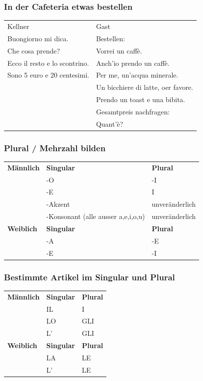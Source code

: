 \documentclass[10pt]{scrartcl}
\begin{document}
\subsubsection*{In der Cafeteria etwas bestellen}
\begin{tabular}{ll}
Kellner & Gast\\
Buongiorno mi dica. & Bestellen:\\
Che cosa prende? & Vorrei un caffè.\\
Ecco il resto e lo scontrino. & Anch'io prendo un caffè.\\
Sono 5 euro e 20 centesimi. & Per me, un'acqua minerale.\\
& Un bicchiere di latte, oer favore.\\
& Prendo un toast e una bibita.\\
& Gesamtpreis nachfragen:\\
& Quant'è?
\end{tabular}
\subsubsection*{Plural / Mehrzahl bilden}
\begin{tabular}{lll}
\textbf{Männlich} & \textbf{Singular} & \textbf{Plural}\\
& -O & -I\\
& -E & I\\
& -Akzent & unveränderlich\\
& -Konsonant (alle ausser a,e,i,o,u) & unveränderlich\\
\textbf{Weiblich} & \textbf{Singular} & \textbf{Plural}\\
& -A & -E\\
& -E & -I\\
\end{tabular}
\subsubsection*{Bestimmte Artikel im Singular und Plural}
\begin{tabular}{lll}
\textbf{Männlich} & \textbf{Singular} & \textbf{Plural}\\
& IL & I\\
& LO & GLI\\
& L' & GLI\\
\textbf{Weiblich} & \textbf{Singular} & \textbf{Plural}\\
& LA & LE\\
& L' & LE\\
\end{tabular}
\end{document}
